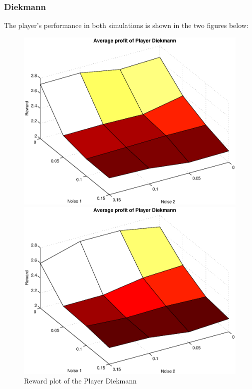 \subsubsection{Diekmann}
The player's performance in both simulations is shown in the two figures below:
\begin{figure}[h]

\begin{minipage}[hbt]{0.65\textwidth}
	\centering
	\includegraphics[width=\textwidth]{pics/simulation1/Reward_vs_Noise_of_Player_Diekmann}
\end{minipage}
\hfill
\begin{minipage}[hbt]{0.3\textwidth}
	\centering
	\includegraphics[width=\textwidth]{pics/simulation2/Reward_vs_Noise_of_Player_Diekmann}
\end{minipage}
	\caption{Reward plot of the Player Diekmann}
	\label{pic player diekmann}
\end{figure}

